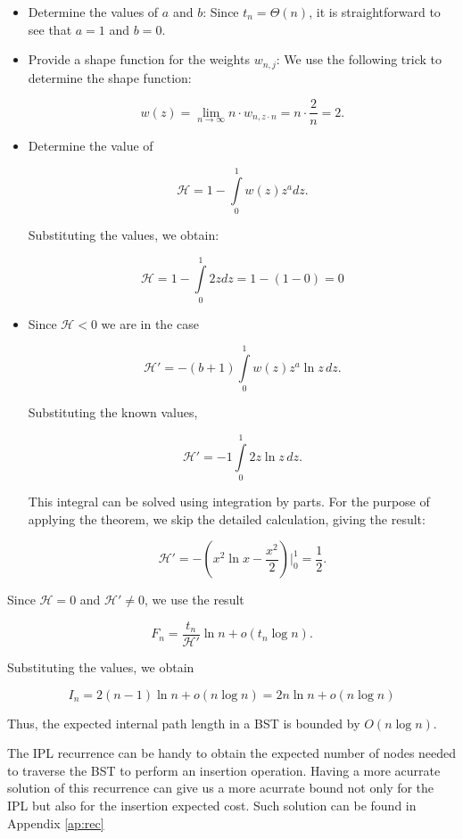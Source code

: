 \begin{itemize}
    \item Determine the values of \( a \) and \( b \): Since \( t_n = \Theta(n) \), it is straightforward to see that $a = 1$ and $b = 0$.
    \item Provide a shape function for the weights \( w_{n,j} \): We use the following trick to determine the shape function:

    \[
    w(z) = \lim\limits_{n\to\infty} n \cdot w_{n,z\cdot n} = n \cdot \frac{2}{n} = 2.
    \]

    \item Determine the value of 

    \[
    \mathcal{H} = 1 - \int\limits_{0}^{1} w(z) z^a dz.
    \]

    Substituting the values, we obtain:

    \[
    \mathcal{H} = 1 - \int\limits_{0}^{1} 2z dz = 1 - (1 - 0) = 0
    \]

    \item Since \( \mathcal{H} < 0 \) we are in the case

    \[
    \mathcal{H'} = -(b+1) \int\limits_{0}^{1} w(z) z^a \ln z \, dz.
    \]

    Substituting the known values,

    \[
    \mathcal{H'} = -1 \int\limits_{0}^{1} 2z \ln z \, dz.
    \]

    This integral can be solved using integration by parts. For the purpose of applying the theorem, we skip the detailed calculation, giving the result:

    \[
    \mathcal{H'} = - (x^2 \ln x - \frac{x^2}{2})\Big|_0^1 = \frac{1}{2}.
    \]

\end{itemize}

Since \( \mathcal{H} = 0 \) and \( \mathcal{H'} \neq 0 \), we use the result

\[
F_n = \frac{t_n}{\mathcal{H'}} \ln n + o(t_n \log n).
\]

Substituting the values, we obtain

\[
I_n = 2(n-1) \ln n + o(n \log n) = 2n \ln n + o(n \log n)
\]

Thus, the expected internal path length in a BST is bounded by \( O(n \log n) \). 

\vspace{10px}

The IPL recurrence can be handy to obtain the expected number of nodes needed to traverse the BST to perform an insertion operation. Having a more acurrate solution of this recurrence can give us a more acurrate bound not only for the IPL but also for the insertion expected cost. Such solution can be found in Appendix \ref{ap:rec}

